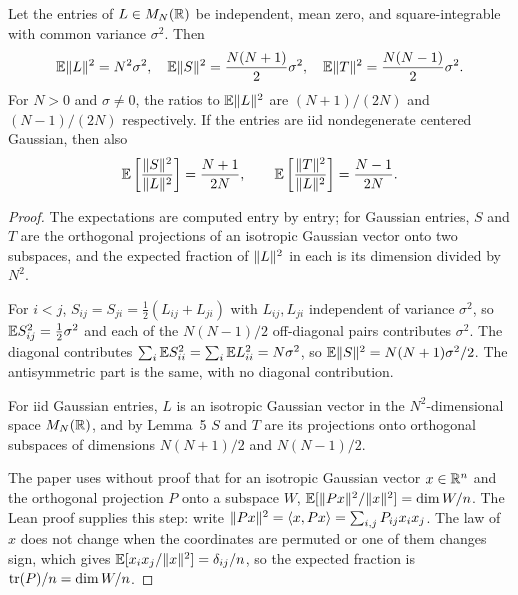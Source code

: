 \begin{corollary}
\label{cor:iid}
\leanok
{}
Let the entries of $L\in M_N(\mathbb{R})$ be independent, mean zero, and
square-integrable with common variance $\sigma^2$. Then
\[
 \mathbb{E}\lVert L\rVert^2=N^2\sigma^2,\quad
 \mathbb{E}\lVert S\rVert^2=\frac{N(N+1)}2\sigma^2,\quad
 \mathbb{E}\lVert T\rVert^2=\frac{N(N-1)}2\sigma^2.
\]
For $N>0$ and $\sigma\ne0$, the ratios to $\mathbb{E}\lVert L\rVert^2$ are
$(N+1)/(2N)$ and $(N-1)/(2N)$ respectively. If the entries are iid
nondegenerate centered Gaussian, then also
\[
 \mathbb{E}\left[\frac{\lVert S\rVert^2}{\lVert L\rVert^2}\right]=\frac{N+1}{2N},
 \qquad
 \mathbb{E}\left[\frac{\lVert T\rVert^2}{\lVert L\rVert^2}\right]=\frac{N-1}{2N}.
\]
\end{corollary}
\begin{proof}
\leanok
{}
The expectations are computed entry by entry; for Gaussian entries, $S$
and $T$ are the orthogonal projections of an isotropic Gaussian vector
onto two subspaces, and the expected fraction of $\lVert L\rVert^2$ in each is
its dimension divided by $N^2$.

For $i<j$, $S_{ij}=S_{ji}=\tfrac12(L_{ij}+L_{ji})$ with $L_{ij},L_{ji}$
independent of variance $\sigma^2$, so $\mathbb{E} S_{ij}^2=\tfrac12\sigma^2$ and
each of the $N(N-1)/2$ off-diagonal pairs contributes $\sigma^2$. The
diagonal contributes $\sum_i\mathbb{E} S_{ii}^2=\sum_i\mathbb{E} L_{ii}^2=N\sigma^2$, so
$\mathbb{E}\lVert S\rVert^2=N(N+1)\sigma^2/2$. The antisymmetric part is the same, with
no diagonal contribution.

For iid Gaussian entries, $L$ is an isotropic Gaussian vector in the
$N^2$-dimensional space $M_N(\mathbb{R})$, and by Lemma~5 $S$ and $T$ are its
projections onto orthogonal subspaces of dimensions $N(N+1)/2$ and
$N(N-1)/2$.

The paper uses without proof that for an isotropic Gaussian vector
$x\in\mathbb{R}^n$ and the orthogonal projection $P$ onto a subspace $W$,
$\mathbb{E}[\lVert Px\rVert^2/\lVert x\rVert^2]=\dim W/n$. The Lean proof supplies this step:
write $\lVert Px\rVert^2=\langle x,Px\rangle=\sum_{i,j}P_{ij}x_ix_j$. The law of
$x$ does not change when the coordinates are permuted or one of them
changes sign, which gives $\mathbb{E}[x_ix_j/\lVert x\rVert^2]=\delta_{ij}/n$, so the
expected fraction is $\operatorname{tr}(P)/n=\dim W/n$.
\end{proof}

